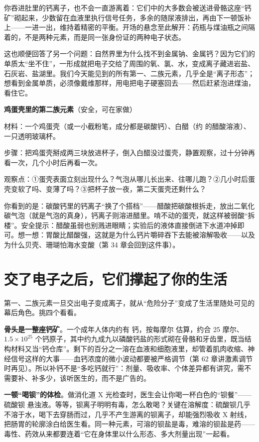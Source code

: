 你吞进肚里的钙离子，也不会一直游离着：它们中的大多数会被送进骨骼这座“钙矿”砌起来，少数留在血液里执行信号任务，多余的随尿液排出，再由下一顿饭补上——一进一出，维持着精密的平衡。开场的悬念至此解开：药瓶与煤油瓶之间隔着的，不是两种元素，而是同一张身份证的两种电子状态。

这也顺便回答了另一个问题：自然界里为什么找不到金属钠、金属钙？因为它们的单质太“坐不住”，一形成就把电子交给了周围的氧、氯、水，变成离子藏进岩盐、石灰岩、盐湖里。我们今天能见到的所有第一、二族元素，几乎全是“离子形态”；想看到金属单质，必须像戴维那样，用电把电子硬塞回去——然后赶紧泡进煤油，看住它。

\begin{shiyan}
\textbf{鸡蛋壳里的第二族元素}（安全，可在家做）

材料：一个鸡蛋壳（或一小截粉笔，成分都是碳酸钙）、白醋（约  的醋酸溶液）、一只透明玻璃杯。

步骤：把鸡蛋壳掰成两三块放进杯子，倒入白醋没过蛋壳，静置观察，过十分钟再看一次，几个小时后再看一次。

观察点：①蛋壳表面立刻出现什么？气泡从哪儿长出来、往哪儿跑？②几小时后蛋壳变软了吗、变薄了吗？③把杯子放一夜，第二天蛋壳还剩什么？

你看到的是：碳酸钙里的钙离子“换了个搭档”——醋酸把碳酸根拆走，放出二氧化碳气泡（就是气泡的真身），钙离子则溶进醋里。啃不动的蛋壳，就这样被弱酸“拆楼”。安全提示：醋酸虽弱也别溅进眼睛；实验后的液体直接倒进下水道冲掉即可。想一想：胃酸比醋酸强，这就是为什么钙片嚼碎吞下去能被溶解吸收——以及为什么贝壳、珊瑚怕海水变酸（第 34 章会回到这件事）。
\end{shiyan}

\section{交了电子之后，它们撑起了你的生活}

第一、二族元素一旦交出电子变成离子，就从“危险分子”变成了生活里随处可见的幕后角色。挑四个看看。

\textbf{骨头是一整座钙矿}。一个成年人体内约有  钙，按每摩尔  估算，约合 25 摩尔、$1.5\times 10^{25}$ 个钙原子，其中约九成九以磷酸钙盐的形式砌在骨骼和牙齿里，既当结构材料又当“钙仓库”。剩下的百分之一溶在血液和细胞液里，却管着肌肉收缩、神经信号这样的大事——血钙浓度的微小波动都要被严格调节（第 62 章讲激素调节时再见）。所以补钙不是“多吃钙就行”：剂量、吸收率、个体差异都有讲究，需不需要补、补多少，该听医生的，而不是广告的。

\textbf{一顿“喝钡”的体检}。做消化道 X 光检查时，医生会让你喝一杯白色的“钡餐”——硫酸钡  悬浊液。等等，钡离子明明有毒，怎么敢喝？关键在溶解度：硫酸钡几乎不溶于水，喝下去穿肠而过，几乎不产生游离的钡离子，却能强烈吸收 X 射线，把肠胃的轮廓涂白给医生看。同一种元素，可溶的钡盐是毒，难溶的钡盐是药——毒性、药效从来都要连着“它在身体里以什么形态、多大剂量出现”一起看。

